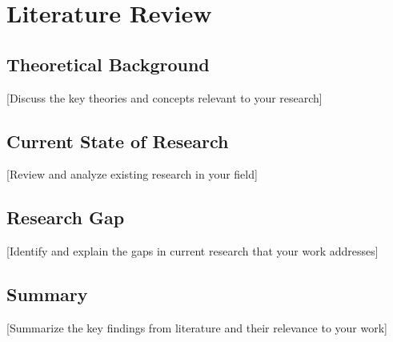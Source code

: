 \chapter{Literature Review}

\section{Theoretical Background}
[Discuss the key theories and concepts relevant to your research]

\section{Current State of Research}
[Review and analyze existing research in your field]

\section{Research Gap}
[Identify and explain the gaps in current research that your work addresses]

\section{Summary}
[Summarize the key findings from literature and their relevance to your work] 